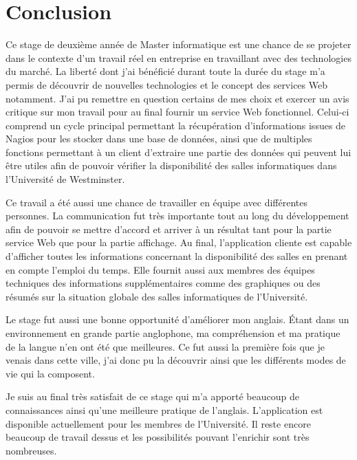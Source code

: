 \chapter{Conclusion}

Ce stage de deuxi\`eme ann\'ee de Master informatique est une chance de se projeter dans le contexte d'un travail r\'eel en entreprise en travaillant avec des technologies du march\'e.
La libert\'e dont j'ai b\'en\'efici\'e durant toute la dur\'ee du stage m'a permis de d\'ecouvrir de nouvelles technologies et le concept des services Web notamment.
J'ai pu remettre en question certains de mes choix et exercer un avis critique sur mon travail pour au final fournir un service Web fonctionnel.
Celui-ci comprend un cycle principal permettant la r\'ecup\'eration d'informations issues de Nagios pour les stocker dans une base de donn\'ees, ainsi que de multiples fonctions permettant \`a un client d'extraire une partie des donn\'ees qui peuvent lui \^etre utiles afin de pouvoir v\'erifier la disponibilit\'e des salles informatiques dans l'Universit\'e de Westminster.

Ce travail a \'et\'e aussi une chance de travailler en \'equipe avec diff\'erentes personnes.
La communication fut tr\`es importante tout au long du d\'eveloppement afin de pouvoir se mettre d'accord et arriver \`a un r\'esultat tant pour la partie service Web que pour la partie affichage.
Au final, l'application cliente est capable d'afficher toutes les informations concernant la disponibilit\'e des salles en prenant en compte l'emploi du temps.
Elle fournit aussi aux membres des \'equipes techniques des informations suppl\'ementaires comme des graphiques ou des r\'esum\'es sur la situation globale des salles informatiques de l'Universit\'e.

Le stage fut aussi une bonne opportunit\'e d'am\'eliorer mon anglais.
\'Etant dans un environnement en grande partie anglophone, ma compr\'ehension et ma pratique de la langue n'en ont \'et\'e que meilleures.
Ce fut aussi la premi\`ere fois que je venais dans cette ville, j'ai donc pu la d\'ecouvrir ainsi que les diff\'erents modes de vie qui la composent.

Je suis au final tr\`es satisfait de ce stage qui m'a apport\'e beaucoup de connaissances ainsi qu'une meilleure pratique de l'anglais.
L'application est disponible actuellement pour les membres de l'Universit\'e.
Il reste encore beaucoup de travail dessus et les possibilit\'es pouvant l'enrichir sont tr\`es nombreuses.

\clearpage
